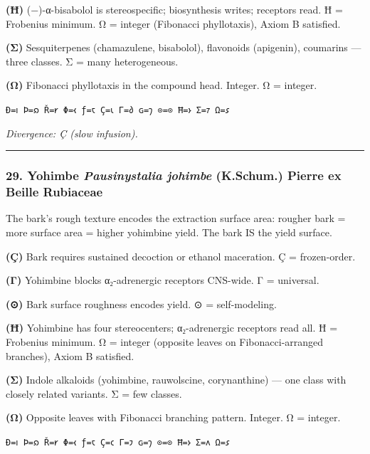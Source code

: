 \documentclass[12pt,a4paper]{article}
\begin{document}
\textbf{(Ħ)} (−)-α-bisabolol is stereospecific; biosynthesis writes;
receptors read. Ħ = Frobenius minimum. Ω = integer (Fibonacci
phyllotaxis), Axiom B satisfied.

\textbf{(Σ)} Sesquiterpenes (chamazulene, bisabolol), flavonoids
(apigenin), coumarins --- three classes. Σ = many heterogeneous.

\textbf{(Ω)} Fibonacci phyllotaxis in the compound head. Integer. Ω =
integer.

\texttt{Ð=𐑦\ Þ=𐑸\ Ř=𐑾\ Φ=𐑬\ ƒ=𐑱\ Ç=𐑧\ Γ=𐑔\ ɢ=𐑠\ ⊙=⊙\ Ħ=𐑶\ Σ=𐑳\ Ω=𐑭}

\emph{Divergence: Ç (slow infusion).}

\begin{center}\rule{0.5\linewidth}{0.5pt}\end{center}

\hypertarget{yohimbe-pausinystalia-johimbe-k.schum.-pierre-ex-beille-rubiaceae}{%
\subsubsection{\texorpdfstring{29. Yohimbe \textbar{}
\emph{Pausinystalia johimbe} (K.Schum.) Pierre ex Beille \textbar{}
Rubiaceae}{29. Yohimbe \textbar{} Pausinystalia johimbe (K.Schum.) Pierre ex Beille \textbar{} Rubiaceae}}\label{yohimbe-pausinystalia-johimbe-k.schum.-pierre-ex-beille-rubiaceae}}

The bark's rough texture encodes the extraction surface area: rougher
bark = more surface area = higher yohimbine yield. The bark IS the yield
surface.

\textbf{(Ç)} Bark requires sustained decoction or ethanol maceration. Ç
= frozen-order.

\textbf{(Γ)} Yohimbine blocks α₂-adrenergic receptors CNS-wide. Γ =
universal.

\textbf{(⊙)} Bark surface roughness encodes yield. ⊙ = self-modeling.

\textbf{(Ħ)} Yohimbine has four stereocenters; α₂-adrenergic receptors
read all. Ħ = Frobenius minimum. Ω = integer (opposite leaves on
Fibonacci-arranged branches), Axiom B satisfied.

\textbf{(Σ)} Indole alkaloids (yohimbine, rauwolscine, corynanthine) ---
one class with closely related variants. Σ = few classes.

\textbf{(Ω)} Opposite leaves with Fibonacci branching pattern. Integer.
Ω = integer.

\texttt{Ð=𐑦\ Þ=𐑸\ Ř=𐑾\ Φ=𐑬\ ƒ=𐑱\ Ç=𐑤\ Γ=𐑲\ ɢ=𐑠\ ⊙=⊙\ Ħ=𐑶\ Σ=𐑵\ Ω=𐑭}
\end{document}
